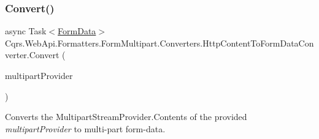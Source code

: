 \subsubsection{\texorpdfstring{Convert()}{Convert()}\hspace{0.1cm}{\footnotesize\ttfamily [2/2]}}
{\footnotesize\ttfamily async Task$<$\hyperlink{classCqrs_1_1WebApi_1_1Formatters_1_1FormMultipart_1_1Infrastructure_1_1FormData}{Form\+Data}$>$ Cqrs.\+Web\+Api.\+Formatters.\+Form\+Multipart.\+Converters.\+Http\+Content\+To\+Form\+Data\+Converter.\+Convert (\begin{DoxyParamCaption}\item[{Multipart\+Memory\+Stream\+Provider}]{multipart\+Provider }\end{DoxyParamCaption})}



Converts the Multipart\+Stream\+Provider.\+Contents of the provided {\itshape multipart\+Provider}  to multi-\/part form-\/data. 

